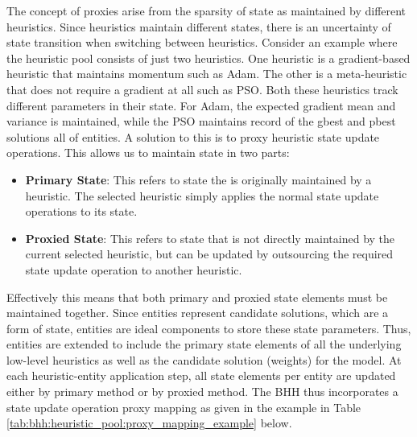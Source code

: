 The concept of proxies arise from the sparsity of state as maintained by different heuristics. Since heuristics maintain different states, there is an uncertainty of state transition when switching between heuristics. Consider an example where the heuristic pool consists of just two heuristics. One heuristic is a gradient-based heuristic that maintains momentum such as \ac{Adam}. The other is a meta-heuristic that does not require a gradient at all such as \ac{PSO}. Both these heuristics track different parameters in their state. For \ac{Adam}, the expected gradient mean and variance is maintained, while the \ac{PSO} maintains record of the gbest and pbest solutions all of entities. A solution to this is to proxy heuristic state update operations. This allows us to maintain state in two parts:

\begin{itemize}
    \item \textbf{Primary State}: This refers to state the is originally maintained by a heuristic. The selected heuristic simply applies the normal state update operations to its state.
    
    \item \textbf{Proxied State}: This refers to state that is not directly maintained by the current selected heuristic, but can be updated by outsourcing the required state update operation to another heuristic.
\end{itemize}

Effectively this means that both primary and proxied state elements must be maintained together. Since entities represent candidate solutions, which are a form of state, entities are ideal components to store these state parameters. Thus, entities are extended to include the primary state elements of all the underlying low-level heuristics as well as the candidate solution (weights) for the model. At each heuristic-entity application step, all state elements per entity are updated either by primary method or by proxied method. The \ac{BHH} thus incorporates a state update operation proxy mapping as given in the example in Table \ref{tab:bhh:heuristic_pool:proxy_mapping_example} below.

